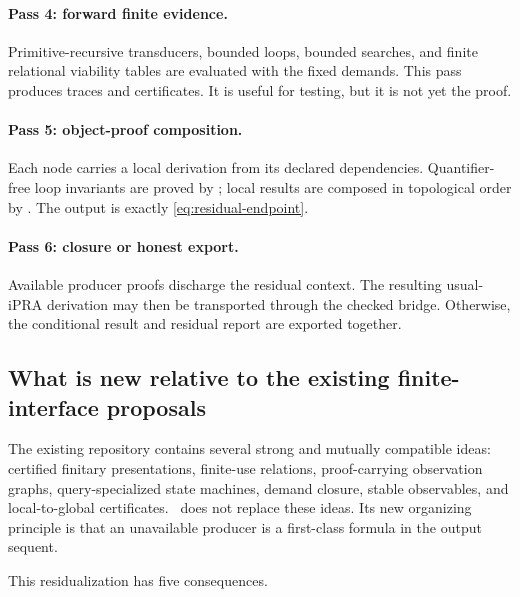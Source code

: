 \paragraph{Pass 4: forward finite evidence.}
Primitive-recursive transducers, bounded loops, bounded searches, and finite relational viability tables are evaluated with the fixed demands.  This pass produces traces and certificates.  It is useful for testing, but it is not yet the proof.

\paragraph{Pass 5: object-proof composition.}
Each node carries a local derivation from its declared dependencies.  Quantifier-free loop invariants are proved by ; local results are composed in topological order by .  The output is exactly \eqref{eq:residual-endpoint}.

\paragraph{Pass 6: closure or honest export.}
Available producer proofs discharge the residual context.  The resulting usual-iPRA derivation may then be transported through the checked  bridge.  Otherwise, the conditional result and residual report are exported together.

\subsection{What is new relative to the existing finite-interface proposals}

The existing repository contains several strong and mutually compatible ideas: certified finitary presentations, finite-use relations, proof-carrying observation graphs, query-specialized state machines, demand closure, stable observables, and local-to-global certificates.  \CIFER\ does not replace these ideas.  Its new organizing principle is that an unavailable producer is a first-class formula in the output sequent.

This residualization has five consequences.

